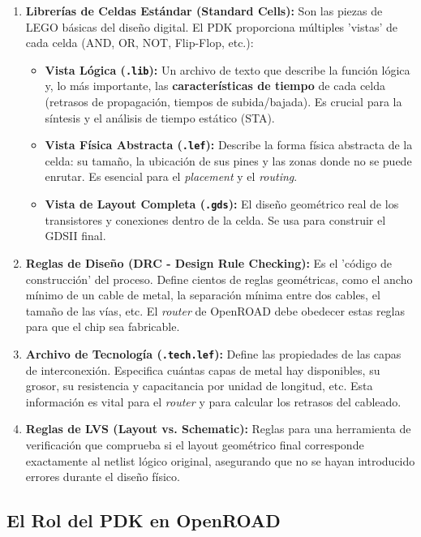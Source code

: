 \documentclass[12pt,a4paper]{article}
\begin{document}
\begin{enumerate}
    \item \textbf{Librerías de Celdas Estándar (Standard Cells):} Son las piezas de LEGO básicas del diseño digital. El PDK proporciona múltiples 'vistas' de cada celda (AND, OR, NOT, Flip-Flop, etc.):
    \begin{itemize}
        \item \textbf{Vista Lógica (\texttt{.lib}):} Un archivo de texto que describe la función lógica y, lo más importante, las \textbf{características de tiempo} de cada celda (retrasos de propagación, tiempos de subida/bajada). Es crucial para la síntesis y el análisis de tiempo estático (STA).
        \item \textbf{Vista Física Abstracta (\texttt{.lef}):} Describe la forma física abstracta de la celda: su tamaño, la ubicación de sus pines y las zonas donde no se puede enrutar. Es esencial para el \textit{placement} y el \textit{routing}.
        \item \textbf{Vista de Layout Completa (\texttt{.gds}):} El diseño geométrico real de los transistores y conexiones dentro de la celda. Se usa para construir el GDSII final.
    \end{itemize}

    \item \textbf{Reglas de Diseño (DRC - Design Rule Checking):} Es el 'código de construcción' del proceso. Define cientos de reglas geométricas, como el ancho mínimo de un cable de metal, la separación mínima entre dos cables, el tamaño de las vías, etc. El \textit{router} de OpenROAD debe obedecer estas reglas para que el chip sea fabricable.

    \item \textbf{Archivo de Tecnología (\texttt{.tech.lef}):} Define las propiedades de las capas de interconexión. Especifica cuántas capas de metal hay disponibles, su grosor, su resistencia y capacitancia por unidad de longitud, etc. Esta información es vital para el \textit{router} y para calcular los retrasos del cableado.

    \item \textbf{Reglas de LVS (Layout vs. Schematic):} Reglas para una herramienta de verificación que comprueba si el layout geométrico final corresponde exactamente al netlist lógico original, asegurando que no se hayan introducido errores durante el diseño físico.
\end{enumerate}

\subsection{El Rol del PDK en OpenROAD}
\end{document}
